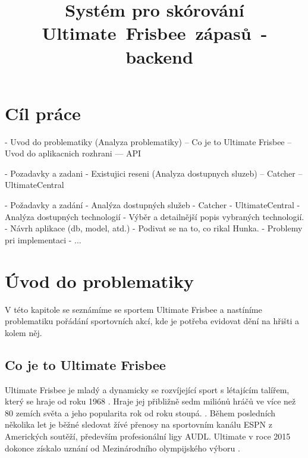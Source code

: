 \documentclass[thesis=B,czech]{FITthesis}[2012/06/26]
\title{Systém pro skórování Ultimate~Frisbee~zápasů~-~backend}
\begin{document}


\begin{introduction}
\end{introduction}

\chapter{Cíl práce}

- Uvod do problematiky (Analyza problematiky)
-- Co je to Ultimate Frisbee
-- Uvod do aplikacnich rozhrani
--- API

- Pozadavky a zadani
- Existujici reseni (Analyza dostupnych sluzeb)
-- Catcher
-- UltimateCentral

- Požadavky a zadání
- Analýza dostupných služeb
  - Catcher
  - UltimateCentral
- Analýza dostupných technologií
  - Výběr a detailnější popis vybraných technologií.
- Návrh aplikace (db, model, atd.)
  - Podivat se na to, co rikal Hunka.
- Problemy pri implementaci
- ...

\chapter{Úvod do problematiky}

\indent

V této kapitole se seznámíme se sportem Ultimate Frisbee a nastíníme problematiku
pořádání sportovních akcí, kde je potřeba evidovat dění na hřišti a kolem něj.

\section{Co je to Ultimate Frisbee}


\indent

Ultimate Frisbee je mladý a dynamicky se rozvíjející sport s létajícím talířem, který se hraje od roku 1968 \cite{cald-o-ultimate}.
Hraje jej přibližně sedm miliónů hráčů ve více než 80 zemích světa a jeho popularita rok od roku stoupá. \cite{usa-about-ultimate}.
Během posledních několika let je běžné sledovat žívé přenosy na sportovním kanálu ESPN z Amerických soutěží, především profesionální ligy AUDL.
Ultimate v roce 2015 dokonce získalo uznání od Mezinárodního olympijského výboru \cite{cald-uznani}. 
\end{document}
